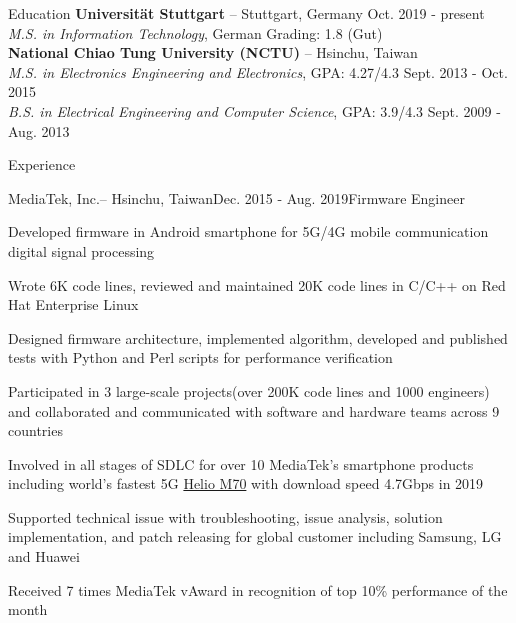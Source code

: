 \documentclass{resume} %
\begin{document}

\begin{rSection}{Education}
{\bf Universität Stuttgart }{--  Stuttgart, Germany}  \hfill {Oct. 2019 - present}\\
{\em M.S. in Information Technology}{, German Grading: 1.8 (Gut) \\ 
{\bf National Chiao Tung University (NCTU) }{--  Hsinchu, Taiwan} \\
\em M.S. in Electronics Engineering and Electronics}{, GPA: 4.27/4.3} \hfill {Sept. 2013 - Oct. 2015}\\ 
{\em B.S. in Electrical Engineering and Computer Science}{, GPA: 3.9/4.3} \hfill {Sept. 2009 - Aug. 2013}
\end{rSection}

\begin{rSection}{Experience}

\begin{rSubsection}{MediaTek, Inc.}{-- Hsinchu, Taiwan}{Dec. 2015 - Aug. 2019}{Firmware Engineer}

\item Developed firmware in Android smartphone for 5G/4G mobile communication digital signal processing
\item Wrote 6K code lines, reviewed and maintained 20K code lines in C/C++ on Red Hat Enterprise Linux
\item Designed firmware architecture, implemented algorithm, developed and published tests with Python and Perl scripts for performance verification 
\item Participated in 3 large-scale projects(over 200K code lines and 1000 engineers) and collaborated and communicated with software and hardware teams across 9 countries
\item Involved in all stages of SDLC for over 10 MediaTek’s smartphone products including world's fastest 5G  \href{https://newsletter.mediatek.com/hubfs/whatis5gnew/infographic.pdf
}{Helio M70} with download speed 4.7Gbps in 2019
\item Supported technical issue with troubleshooting, issue analysis, solution implementation, and patch releasing for global customer including Samsung, LG and Huawei
\item Received 7 times MediaTek vAward in recognition of top 10\% performance of the month

\end{rSubsection}

\end{rSection}
\end{document}
